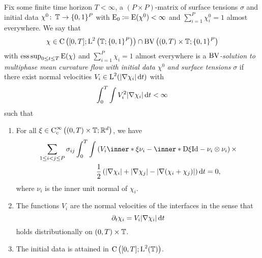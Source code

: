 \begin{definition}
	\label{motion_by_mmcf}
	Fix some finite time horizon $ T < \infty $, a $ ( P \times P ) $-matrix of 
	surface tensions $ \sigma $ and initial data $ \chi^{ 0 } \colon \operatorname{\mathbb{T}} 
	\to \{ 0 , 1 \}^{ P } $ with $ \operatorname{E}_{ 0 } \coloneqq \operatorname{E} ( \chi^{ 0 } 
	) < \infty $ and 
	$ \sum_{ i = 1 }^{ P } \chi_{ i }^{ 0 } = 1 $ almost everywhere. We say that
	\begin{equation*}
		\chi \in \operatorname{C} \left(
		[ 0 , T ]
		;
		\operatorname{L}^{ 2 } \left( \operatorname{\mathbb{T}} ; \{ 0 , 1 \}^{ P } \right)
		\right)
		\cap
		\operatorname{BV} \left(
			( 0 , T ) \times \operatorname{\mathbb{T}} ; \{ 0 , 1 \}^{ P }
		\right)
	\end{equation*}
	with $ \operatorname*{ess\,sup}_{ 0 \leq t \leq T } \operatorname{E} ( \chi ) $ and $ \sum_{ i = 1 
	}^{ P } \chi_{ i } = 1 $ almost everywhere is a $\operatorname{BV}$\emph{-solution to 
	multiphase mean 
	curvature flow with initial data} $ 
	\chi^{ 0 } $ \emph{and surface tensions} $ \sigma $ if there exist normal 
	velocities $ V_{ i } \in \operatorname{L}^{ 2 } ( \abs{ \nabla \chi_{ i } } \dd{ t } ) $ 
	with
	\begin{equation*}
		\int_{ 0 }^{ T }
		\int
		V_{ i }^{ 2 }
		\abs{ \nabla \chi_{ i } }
		\dd{ t }
		< \infty 
	\end{equation*} 
	such that
	\begin{enumerate}
		\item For all 
		$ \xi \in \operatorname{C}_{ \mathrm{c} }^{ \infty } \left(
		( 0 , T ) \times \operatorname{\mathbb{T}} ; \mathbb{ R }^{ d }
		\right)
		$, we have 
		\begin{align}
			\label{distributional_equation_mmcf}
			\sum_{ 1 \leq i < j \leq P }
			\sigma_{ i j }
			\int_{ 0 }^{ T }
			\int
			&
			\left(
			V_{ i } \inner*{ \xi }{ \nu_{ i } }
			-
			\inner*{ \diff \xi }{ \mathrm{Id} - \nu_{ i } \otimes \nu_{ i } }
			\right)
			\times
			\\
			\notag
			& \frac{1}{ 2 }
			\left(
			\abs{ \nabla \chi_{ i } }
			+
			\abs{ \nabla \chi_{ j } }
			-
			\abs{ \nabla ( \chi_{ i } + \chi_{ j } ) }
			\right)
			\dd{ t }
			=0,			
		\end{align}
		where $ \nu_{ i } $ is the inner unit normal of $ \chi_{ i } $.
		
		\item 
		The functions $ V_{ i } $ are the normal velocities of the interfaces 
		in the sense that
		\begin{equation*}
			\partial_{ t } \chi_{ i }
			=
			V_{ i } \abs{ \nabla \chi_{ i } } \dd{ t }
		\end{equation*}
		holds distributionally on $ ( 0 , T ) \times \operatorname{\mathbb{T}} $.
		
		\item
		The initial data is attained in $ \operatorname{C} \left( [ 0 , T ] ; 
		\operatorname{L}^{ 2 } ( \operatorname{\mathbb{T}} ) \right) $.
	\end{enumerate}
\end{definition}

